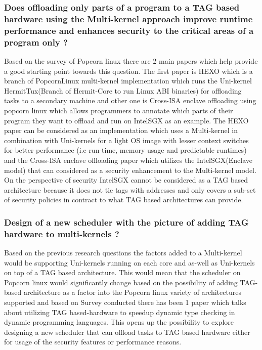 \subsubsection{Does offloading only parts of a program to a TAG based hardware using the Multi-kernel approach improve runtime performance 
and enhances security to the critical areas of a program only ?}
Based on the survey of Popcorn linux there are 2 main papers which help provide a good starting point towards this question. The first 
paper is HEXO \cite{HEXO} which is a branch of PopcornLinux multi-kernel implementation which runs the Uni-kernel HermitTux(Branch of 
Hermit-Core to run Linux ABI binaries) for offloading tasks to a secondary machine and other one is Cross-ISA enclave offloading using
popcorn linux \cite{PopcornEnclave} which allows programmers to annotate which parts of their program they want to offload and run on
IntelSGX\cite{IntelSGX} as an example. The HEXO paper can be considered as an implementation which uses a Multi-kernel in combination with Uni-kernels
for a light OS image with lesser context switches for better performance (i.e run-time, memory usage and predictable runtimes)
and the Cross-ISA enclave offloading paper which utilizes the IntelSGX(Enclave model\cite{Enclave}) that can considered as 
a security enhancement to the Multi-kernel model. On the perspective of security IntelSGX cannot be considered as 
a TAG based architecture because it does not tie tags with addresses and only covers a sub-set of security policies in contract 
to what TAG based architectures can provide.

\subsubsection{Design of a new scheduler with the picture of adding TAG hardware to multi-kernels ?}
Based on the previous research questions the factors added to a Multi-kernel would be supporting Uni-kernels running on 
each core and as-well as Uni-kernels on top of a TAG based architecture. This would mean that the scheduler on 
Popcorn linux would significantly change based on the possibility of adding TAG-based architecture as a factor into the 
Popcorn linux variety of architectures supported and based on Survey conducted there has been 1 paper\cite{TypedArchitecture} 
which talks about utilizing TAG based-hardware to speedup dynamic type checking in dynamic programming languages. This opens up the possibility to explore designing a 
new scheduler that can offload tasks to TAG based hardware either for usage of the security features or performance reasons. 